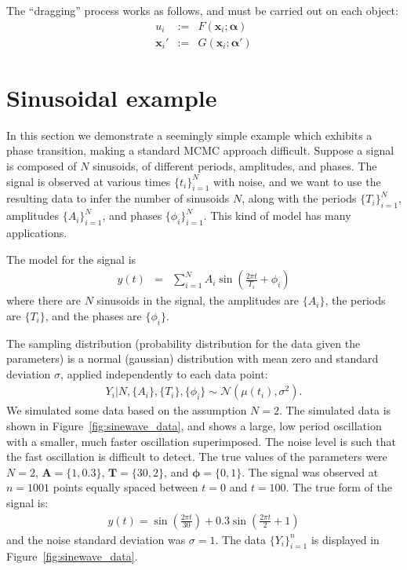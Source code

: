 \documentclass[letterpaper, 11pt]{article}
\newcommand{\hyperparams}{\boldsymbol{\alpha}}
\newcommand{\xx}{\mathbf{x}}
\begin{document}
The ``dragging'' process works as follows, and must be carried out on
each object:
\begin{eqnarray}
u_i &:=& F(\xx_i; \hyperparams)\\
\xx_i' &:=& G(\xx_i; \hyperparams')
\end{eqnarray}

\section{Sinusoidal example}
In this section we demonstrate a seemingly simple example which exhibits
a phase transition, making a standard MCMC approach difficult. Suppose
a signal is composed of $N$ sinusoids, of different periods, amplitudes,
and phases. The signal is observed at various times $\{t_i\}_{i=1}^N$ with
noise, and we want to use the resulting data to infer the number of sinusoids
$N$, along with the periods $\{T_i\}_{i=1}^N$, amplitudes $\{A_i\}_{i=1}^N$,
and phases $\{\phi_i\}_{i=1}^N$.
This kind of model has many applications\citep[see e.g.][]{bretthorst}.

The model for the signal is
\begin{eqnarray}
y(t) &=& \sum_{i=1}^N A_i \sin \left(\frac{2\pi t}{T_i} + \phi_i\right)
\end{eqnarray}
where there are $N$ sinusoids in the signal, the
amplitudes are $\{A_i\}$, the periods are $\{T_i\}$, and the phases are
$\{\phi_i\}$.

The sampling distribution (probability distribution for the data given the
parameters) is a normal (gaussian) distribution with mean zero and standard
deviation $\sigma$, applied independently to each data point:
\begin{eqnarray}
Y_i | N, \{A_i\}, \{T_i\}, \{\phi_i\} \sim
\mathcal{N}\left(\mu(t_i), \sigma^2\right).
\end{eqnarray}
We simulated some data based on the assumption $N=2$.
The simulated data is shown in Figure~\ref{fig:sinewave_data}, and shows a
large, low period oscillation with a smaller, much faster oscillation
superimposed. The noise level is such that the fast oscillation is difficult
to detect. The true values of the parameters were
$N=2$, $\mathbf{A} = \{1, 0.3\}$,
$\mathbf{T}=\{30, 2\}$, and $\boldsymbol{\phi} = \{0, 1\}$. The signal was
observed at $n=1001$ points equally spaced between $t=0$ and $t=100$.
The true form of the signal is:
\begin{eqnarray}
y(t) = \sin\left(\frac{2\pi t}{30}\right) +
0.3 \sin\left(\frac{2\pi t}{2} + 1\right)
\end{eqnarray}
and the noise standard deviation was $\sigma = 1$. The data $\{Y_i\}_{i=1}^n$
is displayed in Figure~\ref{fig:sinewave_data}.
\end{document}
